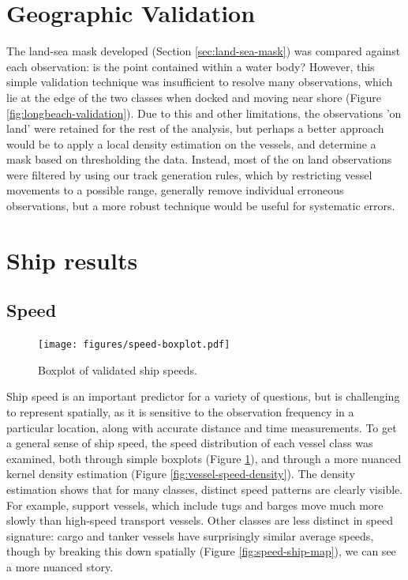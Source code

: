 \section{Geographic Validation}

The land-sea mask developed (Section \ref{sec:land-sea-mask}) was compared against each observation: is the point contained within a water body? However, this simple validation technique was insufficient to resolve many observations, which lie at the edge of the two classes when docked %
 and moving near shore %
(Figure \ref{fig:longbeach-validation}). Due to this and other limitations, the observations 'on land' were retained for the rest of the analysis, but perhaps a better approach would be to apply a local density estimation on the vessels, and determine a mask based on thresholding the data. Instead, most of the on land observations were filtered by using our track generation rules, which by restricting vessel movements to a possible range, generally remove individual erroneous observations, but a more robust technique would be useful for systematic errors.


\section{Ship results}

\subsection{Speed}
\begin{figure}[htbp]
  \centering
  \texttt{[image: figures/speed-boxplot.pdf]}
  \caption[Validated ship speeds by class]{Boxplot of validated ship speeds.}
  \label{fig:vessel-speed-boxplot} %
\end{figure}

Ship speed is an important predictor for a variety of questions, but is challenging to represent spatially, as it is sensitive to the observation frequency in a particular location, along with accurate distance and time measurements. To get a general sense of ship speed, the speed distribution of each vessel class was examined, both through simple boxplots (Figure \ref{fig:vessel-speed-boxplot}), and through a more nuanced kernel density estimation (Figure \ref{fig:vessel-speed-density}). The density estimation shows that for many classes, distinct speed patterns are clearly visible. For example, support vessels, which include tugs and barges move much more slowly than high-speed transport vessels. Other classes are less distinct in speed signature: cargo and tanker vessels have surprisingly similar average speeds, though by breaking this down spatially (Figure \ref{fig:speed-ship-map}), we can see a more nuanced story.

